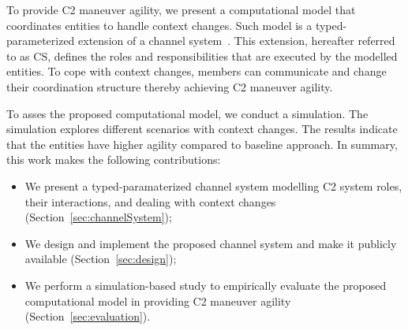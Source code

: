 
To provide C2 maneuver agility, we present a computational model that coordinates entities to handle context changes. Such model is a typed-parameterized extension of a channel system~\citep{modelcheckingBaier}. This extension, hereafter referred to as CS, defines the roles and responsibilities that are executed by the modelled entities. To cope with context changes, members can communicate and change their coordination structure thereby achieving C2 maneuver agility.


To asses the proposed computational model, we conduct a simulation. The simulation explores different scenarios with context changes. The results indicate that the entities have higher agility compared to baseline approach. In summary, this work makes the following contributions:

\begin{itemize}
    \item We present a typed-paramaterized channel system modelling C2 system roles, their interactions, and dealing with context changes (Section~\ref{sec:channelSystem});
    \item We design and implement the proposed channel system and make it  publicly available (Section~\ref{sec:design});
    \item We perform a simulation-based study to empirically evaluate the proposed computational model in providing C2 maneuver agility (Section~\ref{sec:evaluation}). 
\end{itemize}
